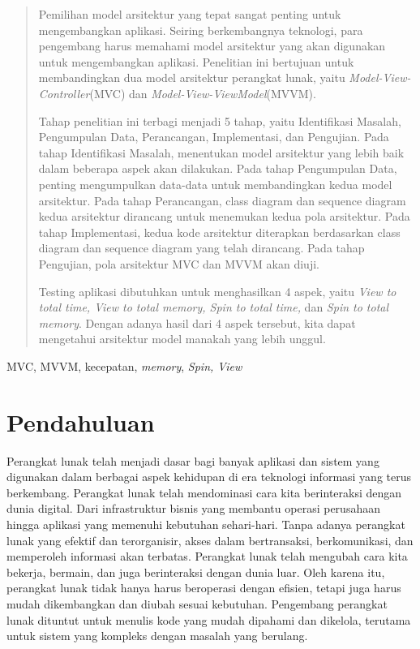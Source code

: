 \documentclass[conference]{IEEEtran}
\begin{document}
	\begin{abstract}
		Pemilihan model arsitektur yang tepat sangat penting untuk mengembangkan aplikasi. Seiring berkembangnya teknologi, para pengembang harus memahami model arsitektur yang akan digunakan untuk mengembangkan aplikasi. Penelitian ini bertujuan untuk membandingkan dua model arsitektur perangkat lunak, yaitu \textit{Model-View-Controller}(MVC) dan \textit{Model-View-ViewModel}(MVVM). 
		
		Tahap penelitian ini terbagi menjadi 5 tahap, yaitu Identifikasi Masalah, Pengumpulan Data, Perancangan, Implementasi, dan Pengujian. Pada tahap Identifikasi Masalah, menentukan model arsitektur yang lebih baik dalam beberapa aspek akan dilakukan.  Pada tahap Pengumpulan Data, penting mengumpulkan data-data untuk membandingkan kedua model arsitektur. Pada tahap Perancangan, class diagram dan sequence diagram kedua arsitektur dirancang untuk menemukan kedua pola arsitektur. Pada tahap Implementasi, kedua kode arsitektur diterapkan berdasarkan class diagram dan sequence diagram yang telah dirancang. Pada tahap Pengujian, pola arsitektur MVC dan MVVM akan diuji.
		
		Testing aplikasi dibutuhkan untuk menghasilkan 4 aspek, yaitu \textit{View to total time, View to total memory, Spin to total time,} dan \textit{Spin to total memory}. Dengan adanya hasil dari 4 aspek tersebut, kita dapat mengetahui arsitektur model manakah yang lebih unggul.
		
		
	\end{abstract}
	
	\begin{IEEEkeywords}
		MVC, MVVM, kecepatan, \textit{memory}, \textit{Spin, View}
	\end{IEEEkeywords}
	
	\section{Pendahuluan}
	
	Perangkat lunak telah menjadi dasar bagi banyak aplikasi dan sistem yang digunakan dalam berbagai aspek kehidupan di era teknologi informasi yang terus berkembang. Perangkat lunak telah mendominasi cara kita berinteraksi dengan dunia digital. Dari infrastruktur bisnis yang membantu operasi perusahaan hingga aplikasi yang memenuhi kebutuhan sehari-hari. Tanpa adanya perangkat lunak yang efektif dan terorganisir, akses dalam bertransaksi, berkomunikasi, dan memperoleh informasi akan terbatas. Perangkat lunak telah mengubah cara kita bekerja, bermain, dan juga berinteraksi dengan dunia luar.  Oleh karena itu, perangkat lunak tidak hanya harus beroperasi dengan efisien, tetapi juga harus mudah dikembangkan dan diubah sesuai kebutuhan. Pengembang perangkat lunak dituntut untuk menulis kode yang mudah dipahami dan dikelola, terutama untuk sistem yang kompleks dengan masalah yang berulang.
	
\end{document}
